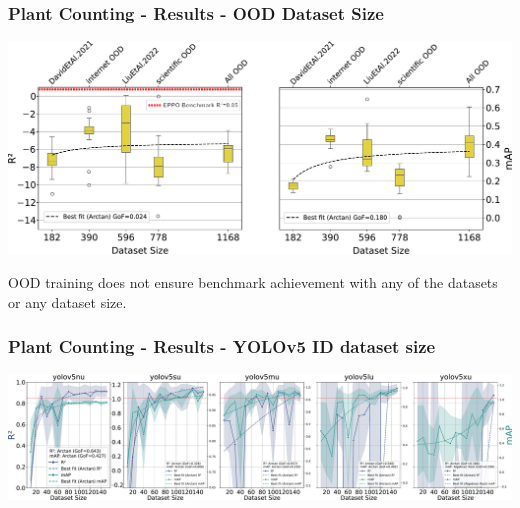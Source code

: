 \documentclass[aspectratio=43]{beamer}
\begin{document}
\begin{frame}
    \frametitle{\small Plant Counting - Results - OOD Dataset Size}
    \begin{center}
        \includegraphics[width=1\textwidth]{Imgs/metrics_OOD_datasets.pdf}
    \end{center}
    \small OOD training does not ensure benchmark achievement with any of the datasets or any dataset size.
\end{frame}

\begin{frame}
    \frametitle{\small Plant Counting - Results - YOLOv5 ID dataset size}
    \begin{center}
        \includegraphics[width=1\textwidth]{Imgs/r2_ap_vs_dataset_size_yolov5.pdf}
    \end{center}
\end{frame}
\end{document}
